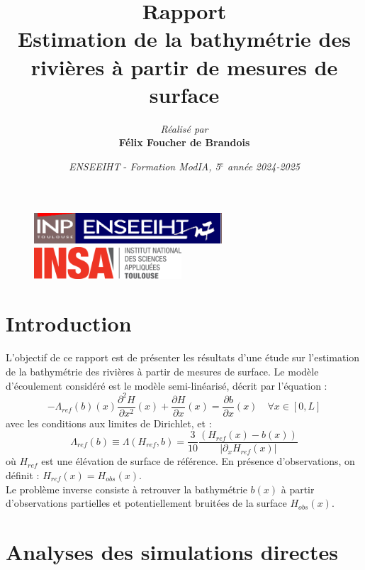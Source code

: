 \documentclass[12pt,a4paper]{article}
\title{\vspace{4cm}
        Rapport \\
        \vspace{1cm} \textbf{Estimation de la bathymétrie des rivières à partir de mesures de surface} \\ 
        \vspace{4cm} 
}
\author{\textit{Réalisé par} \vspace{0.5cm}\\
        \textbf{Félix Foucher de Brandois}
}
\date{\vfill
        \textit{ENSEEIHT} - 
        \textit{Formation ModIA, 5$^{e}$ année}
        \hfill
        \textit{2024-2025} \\
        \vspace{1cm}
}
\begin{document}
\begin{figure}[t]
    \centering
    \includegraphics[width=7cm]{src/inp_n7.png}
    \hfill
    \includegraphics[width=5.5cm]{src/insa_toulouse.png}
\end{figure}


\maketitle
\thispagestyle{empty}

\newpage


\section{Introduction}

L'objectif de ce rapport est de présenter les résultats d'une étude sur l'estimation de la bathymétrie des rivières à partir de mesures de surface.
Le modèle d'écoulement considéré est le modèle semi-linéarisé, décrit par l'équation :
\begin{equation}
    -\Lambda_{ref}(b)(x)\frac{\partial^{2}H}{\partial x^{2}}(x) + \frac{\partial H}{\partial x}(x) = \frac{\partial b}{\partial x}(x) \quad \forall x \in [0,L]
\end{equation}
avec les conditions aux limites de Dirichlet, et :
$$
\Lambda_{ref}(b) \equiv \Lambda(H_{ref}, b) = \frac{3}{10} \frac{(H_{ref}(x) - b(x))}{|\partial_{x}H_{ref}(x)|}
$$
où $H_{ref}$ est une élévation de surface de référence.
En présence d'observations, on définit : $H_{ref}(x) = H_{obs}(x)$. \\

Le problème inverse consiste à retrouver la bathymétrie $b(x)$ à partir d’observations partielles et potentiellement bruitées de la surface $H_{obs}(x)$.



\section{Analyses des simulations directes}
\end{document}
